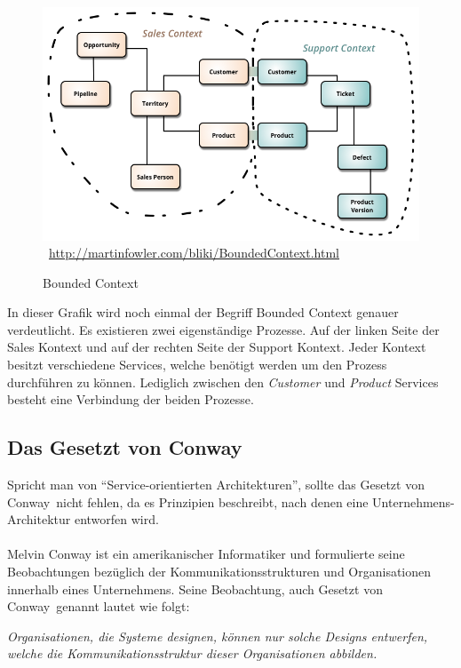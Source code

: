 \begin{figure}[htb]
    \centering 
    \includegraphics[width=\linewidth]{content/images/BoundedContext}\
    \quelle\url{http://martinfowler.com/bliki/BoundedContext.html}
    \caption[Bounded Context]{Bounded Context\\}
    \label{fig:BoundedContext}  
\end{figure} 
In dieser Grafik wird noch einmal der Begriff Bounded Context genauer verdeutlicht. Es existieren zwei eigenständige Prozesse. Auf der linken Seite der Sales Kontext und auf der rechten Seite der Support Kontext. Jeder Kontext besitzt verschiedene Services, welche benötigt werden um den Prozess durchführen zu können. Lediglich zwischen den \textit{Customer} und \textit{Product} Services besteht eine Verbindung der beiden Prozesse.

\subsection{Das Gesetzt von Conway}
\label{subsec:conway}
Spricht man von "`Service-orientierten Architekturen"', sollte das \glqq Gesetzt von Conway\grqq\ nicht fehlen, da es Prinzipien beschreibt, nach denen eine Unternehmens-Architektur entworfen wird.
\\\\
Melvin Conway ist ein amerikanischer Informatiker und formulierte seine Beobachtungen bezüglich der Kommunikationsstrukturen und Organisationen innerhalb eines Unternehmens. Seine Beobachtung, auch \glqq Gesetzt von Conway\grqq\ genannt lautet wie folgt:
\begin{center}
    \textit{Organisationen, die Systeme designen, können nur solche Designs entwerfen, welche die Kommunikationsstruktur dieser Organisationen abbilden.}
\end{center}

